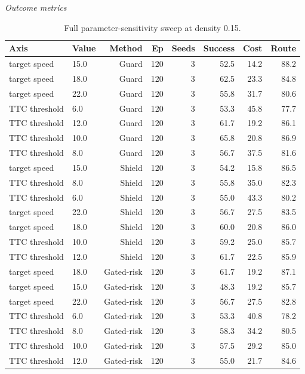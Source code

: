 \begin{table}[!htbp]
\centering
\caption{Full parameter-sensitivity sweep at density 0.15.}
\label{tab_sensitivity}
\tiny
\setlength{\tabcolsep}{3.2pt}
\renewcommand{\arraystretch}{1.08}
\textit{Outcome metrics}\par
\begin{tabular}{@{}llrrrrrr@{}}
\toprule
Axis & Value & Method & Ep & Seeds & Success & Cost & Route \\
\midrule
target speed & 15.0 & Guard & 120 & 3 & 52.5 & 14.2 & 88.2 \\
target speed & 18.0 & Guard & 120 & 3 & 62.5 & 23.3 & 84.8 \\
target speed & 22.0 & Guard & 120 & 3 & 55.8 & 31.7 & 80.6 \\
TTC threshold & 6.0 & Guard & 120 & 3 & 53.3 & 45.8 & 77.7 \\
TTC threshold & 12.0 & Guard & 120 & 3 & 61.7 & 19.2 & 86.1 \\
TTC threshold & 10.0 & Guard & 120 & 3 & 65.8 & 20.8 & 86.9 \\
TTC threshold & 8.0 & Guard & 120 & 3 & 56.7 & 37.5 & 81.6 \\
target speed & 15.0 & Shield & 120 & 3 & 54.2 & 15.8 & 86.5 \\
TTC threshold & 8.0 & Shield & 120 & 3 & 55.8 & 35.0 & 82.3 \\
TTC threshold & 6.0 & Shield & 120 & 3 & 55.0 & 43.3 & 80.2 \\
target speed & 22.0 & Shield & 120 & 3 & 56.7 & 27.5 & 83.5 \\
target speed & 18.0 & Shield & 120 & 3 & 60.0 & 20.8 & 86.0 \\
TTC threshold & 10.0 & Shield & 120 & 3 & 59.2 & 25.0 & 85.7 \\
TTC threshold & 12.0 & Shield & 120 & 3 & 61.7 & 22.5 & 85.9 \\
target speed & 18.0 & Gated-risk & 120 & 3 & 61.7 & 19.2 & 87.1 \\
target speed & 15.0 & Gated-risk & 120 & 3 & 48.3 & 19.2 & 85.7 \\
target speed & 22.0 & Gated-risk & 120 & 3 & 56.7 & 27.5 & 82.8 \\
TTC threshold & 6.0 & Gated-risk & 120 & 3 & 53.3 & 40.8 & 78.2 \\
TTC threshold & 8.0 & Gated-risk & 120 & 3 & 58.3 & 34.2 & 80.5 \\
TTC threshold & 10.0 & Gated-risk & 120 & 3 & 57.5 & 29.2 & 85.0 \\
TTC threshold & 12.0 & Gated-risk & 120 & 3 & 55.0 & 21.7 & 84.6 \\

\end{tabular}
\end{table}
